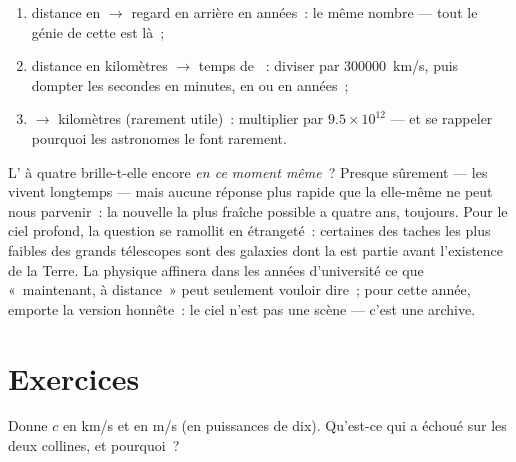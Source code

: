 \begin{method}\label{met:g8:speed-of-light:convert}
\begin{enumerate}
  \item distance en  $\to$ regard en arrière en
        années~: le même nombre --- tout le génie de cette  est
        là~;
  \item distance en kilomètres $\to$ temps de ~: diviser par
        \qty{300000}{km/s}, puis dompter les secondes en minutes, en
         ou en années~;
  \item {} $\to$ kilomètres (rarement utile)~:
        multiplier par $9.5 \times 10^{12}$ --- et se rappeler
        pourquoi les astronomes le font rarement.
\end{enumerate}
\end{method}

\begin{remark}\label{rem:g8:speed-of-light:now}
L' à quatre  brille-t-elle encore \emph{en ce
moment même}~? Presque sûrement --- les  vivent longtemps ---
mais aucune réponse plus rapide que la  elle-même ne peut nous
parvenir~: la nouvelle la plus fraîche possible a quatre ans, toujours.
Pour le ciel profond, la question se ramollit en étrangeté~: certaines
des taches les plus faibles des grands télescopes sont des galaxies
dont la  est partie avant l'existence de la Terre. La physique
affinera dans les années d'université ce que «~maintenant, à
distance~» peut seulement vouloir dire~; pour cette année, emporte la
version honnête~: le ciel n'est pas une scène --- c'est une archive.
\end{remark}

\section{Exercices}

\begin{exercise}[$\star$]\label{exo:g8:speed-of-light:1}
Donne $c$ en \unit{km/s} et en \unit{m/s} (en puissances de dix).
Qu'est-ce qui a échoué sur les deux collines, et pourquoi~?
\end{exercise}

